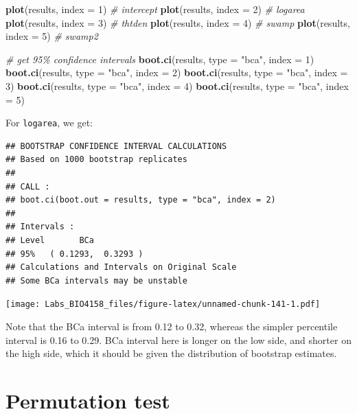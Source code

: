 \documentclass[
  12pt,
]{book}
\newenvironment{Shaded}{\begin{snugshade}}{\end{snugshade}}
\newcommand{\CommentTok}[1]{\textcolor[rgb]{0.56,0.35,0.01}{\textit{#1}}}
\newcommand{\DataTypeTok}[1]{\textcolor[rgb]{0.13,0.29,0.53}{#1}}
\newcommand{\DecValTok}[1]{\textcolor[rgb]{0.00,0.00,0.81}{#1}}
\newcommand{\KeywordTok}[1]{\textcolor[rgb]{0.13,0.29,0.53}{\textbf{#1}}}
\newcommand{\NormalTok}[1]{#1}
\newcommand{\StringTok}[1]{\textcolor[rgb]{0.31,0.60,0.02}{#1}}
\begin{document}
\begin{Shaded}
\begin{Highlighting}[]
\KeywordTok{plot}\NormalTok{(results, }\DataTypeTok{index =} \DecValTok{1}\NormalTok{) }\CommentTok{\# intercept}
\KeywordTok{plot}\NormalTok{(results, }\DataTypeTok{index =} \DecValTok{2}\NormalTok{) }\CommentTok{\# logarea}
\KeywordTok{plot}\NormalTok{(results, }\DataTypeTok{index =} \DecValTok{3}\NormalTok{) }\CommentTok{\# thtden}
\KeywordTok{plot}\NormalTok{(results, }\DataTypeTok{index =} \DecValTok{4}\NormalTok{) }\CommentTok{\# swamp}
\KeywordTok{plot}\NormalTok{(results, }\DataTypeTok{index =} \DecValTok{5}\NormalTok{) }\CommentTok{\# swamp2}

\CommentTok{\# get 95\% confidence intervals}
\KeywordTok{boot.ci}\NormalTok{(results, }\DataTypeTok{type =} \StringTok{"bca"}\NormalTok{, }\DataTypeTok{index =} \DecValTok{1}\NormalTok{)}
\KeywordTok{boot.ci}\NormalTok{(results, }\DataTypeTok{type =} \StringTok{"bca"}\NormalTok{, }\DataTypeTok{index =} \DecValTok{2}\NormalTok{)}
\KeywordTok{boot.ci}\NormalTok{(results, }\DataTypeTok{type =} \StringTok{"bca"}\NormalTok{, }\DataTypeTok{index =} \DecValTok{3}\NormalTok{)}
\KeywordTok{boot.ci}\NormalTok{(results, }\DataTypeTok{type =} \StringTok{"bca"}\NormalTok{, }\DataTypeTok{index =} \DecValTok{4}\NormalTok{)}
\KeywordTok{boot.ci}\NormalTok{(results, }\DataTypeTok{type =} \StringTok{"bca"}\NormalTok{, }\DataTypeTok{index =} \DecValTok{5}\NormalTok{)}
\end{Highlighting}
\end{Shaded}

For \texttt{logarea}, we get:

\begin{verbatim}
## BOOTSTRAP CONFIDENCE INTERVAL CALCULATIONS
## Based on 1000 bootstrap replicates
## 
## CALL : 
## boot.ci(boot.out = results, type = "bca", index = 2)
## 
## Intervals : 
## Level       BCa          
## 95%   ( 0.1293,  0.3293 )  
## Calculations and Intervals on Original Scale
## Some BCa intervals may be unstable
\end{verbatim}

\texttt{[image: Labs\_BIO4158\_files/figure-latex/unnamed-chunk-141-1.pdf]}

Note that the BCa interval is from 0.12 to 0.32, whereas the simpler percentile interval is 0.16 to 0.29. BCa interval here is longer on the low side, and shorter on the high side, which it should be given the distribution of bootstrap estimates.

\hypertarget{permutation-test-1}{%
\section{Permutation test}\label{permutation-test-1}}
\end{document}
